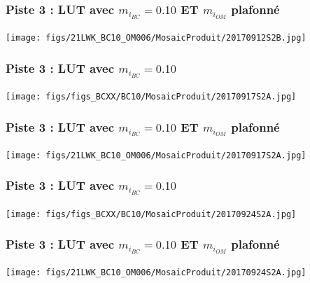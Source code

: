 \documentclass[8pt]{beamer}
\begin{document}
\begin{frame}
\frametitle{Piste 3 : LUT avec $m_{i_{BC}} = 0.10$ ET $m_{i_{OM}}$ plafonné}
	\begin{center}
     	\texttt{[image: figs/21LWK\_BC10\_OM006/MosaicProduit/20170912S2B.jpg]}
    \end{center}		
\end{frame}

\begin{frame}
\frametitle{Piste 3 : LUT avec $m_{i_{BC}} = 0.10$}
	\begin{center}
     	\texttt{[image: figs/figs\_BCXX/BC10/MosaicProduit/20170917S2A.jpg]}
    \end{center}		
\end{frame}

\begin{frame}
\frametitle{Piste 3 : LUT avec $m_{i_{BC}} = 0.10$ ET $m_{i_{OM}}$ plafonné}
	\begin{center}
     	\texttt{[image: figs/21LWK\_BC10\_OM006/MosaicProduit/20170917S2A.jpg]}
    \end{center}		
\end{frame}

\begin{frame}
\frametitle{Piste 3 : LUT avec $m_{i_{BC}} = 0.10$}
	\begin{center}
     	\texttt{[image: figs/figs\_BCXX/BC10/MosaicProduit/20170924S2A.jpg]}
    \end{center}		
\end{frame}

\begin{frame}
\frametitle{Piste 3 : LUT avec $m_{i_{BC}} = 0.10$ ET $m_{i_{OM}}$ plafonné}
	\begin{center}
     	\texttt{[image: figs/21LWK\_BC10\_OM006/MosaicProduit/20170924S2A.jpg]}
    \end{center}		
\end{frame}


\end{document}
